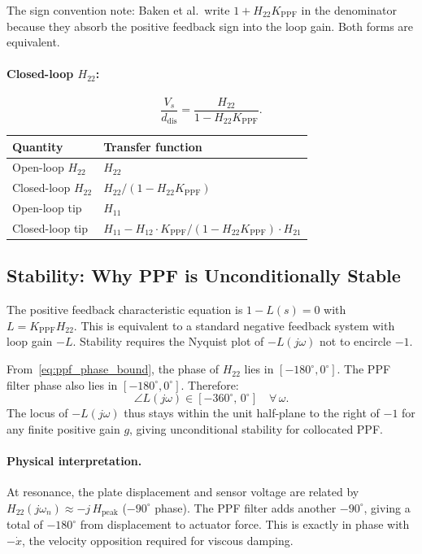 \documentclass[12pt,a4paper]{article}
\begin{document}
The sign convention note: Baken et al.\ write $1 + H_{22} K_\text{PPF}$ in the
denominator because they absorb the positive feedback sign into the loop gain.
Both forms are equivalent.

\paragraph{Closed-loop $H_{22}$:}
\begin{equation}
  \frac{V_s}{d_\text{dis}} = \frac{H_{22}}{1 - H_{22} K_\text{PPF}}.
  \label{eq:ppf_clH22}
\end{equation}

\begin{center}
\begin{tabular}{ll}
\toprule
Quantity & Transfer function \\
\midrule
Open-loop $H_{22}$ & $H_{22}$ \\
Closed-loop $H_{22}$ & $H_{22}/(1 - H_{22}K_\text{PPF})$ \\
Open-loop tip & $H_{11}$ \\
Closed-loop tip & $H_{11} - H_{12}\cdot K_\text{PPF}/(1-H_{22}K_\text{PPF})\cdot H_{21}$ \\
\bottomrule
\end{tabular}
\end{center}

\subsection{Stability: Why PPF is Unconditionally Stable}
\label{sec:ppf_stability}

The positive feedback characteristic equation is $1 - L(s) = 0$ with
$L = K_\text{PPF} H_{22}$.  This is equivalent to a standard negative feedback
system with loop gain $-L$.  Stability requires the Nyquist plot of $-L(j\omega)$
not to encircle $-1$.

From~\eqref{eq:ppf_phase_bound}, the phase of $H_{22}$ lies in
$[-180^\circ, 0^\circ]$.  The PPF filter phase also lies in
$[-180^\circ, 0^\circ]$.  Therefore:
\begin{equation}
  \angle L(j\omega) \in [-360^\circ,\, 0^\circ] \quad \forall\,\omega.
\end{equation}
The locus of $-L(j\omega)$ thus stays within the unit half-plane to the right of
$-1$ for any finite positive gain $g$, giving unconditional stability for
collocated PPF.

\paragraph{Physical interpretation.}
At resonance, the plate displacement and sensor voltage are related by
$H_{22}(j\omega_n) \approx -j\,H_\text{peak}$ ($-90^\circ$ phase).  The PPF
filter adds another $-90^\circ$, giving a total of $-180^\circ$ from displacement
to actuator force.  This is exactly in phase with $-\dot{x}$, the velocity
opposition required for viscous damping.
\end{document}
